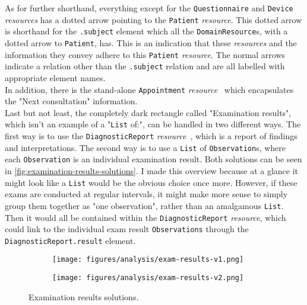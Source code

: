 \noindent
As for further shorthand, everything except for the \texttt{Questionnaire} and \texttt{Device} \emph{resources} has a dotted arrow pointing to the \texttt{Patient} \emph{resource}. This dotted arrow is shorthand for the \texttt{.subject} element which all the \texttt{DomainResource}s, with a dotted arrow to \texttt{Patient}, has. This is an indication that these \emph{resources} and the information they convey adhere to this \texttt{Patient} \emph{resource}. The normal arrows indicate a relation other than the \texttt{.subject} relation and are all labelled with appropriate element names.
\\
In addition, there is the stand-alone \texttt{Appointment} \emph{resource}~\cite{FHIR-Appointment-resource} which encapsulates the "Next consultation" information.
\\
Last but not least, the completely dark rectangle called "Examination results", which isn't an example of a "\texttt{List} of:", can be handled in two different ways. The first way is to use the \texttt{DiagnosticReport} \emph{resource}~\cite{FHIR-DiagnosticReport-resource}, which is a report of findings and interpretations. The second way is to use a \texttt{List} of \texttt{Observation}s, where each \texttt{Observation} is an individual examination result. Both solutions can be seen in \autoref{fig:examination-results-solutions}. I made this overview because at a glance it might look like a \texttt{List} would be the obvious choice once more. However, if these exams are conducted at regular intervals, it might make more sense to simply group them together as "one observation", rather than an amalgamous \texttt{List}. Then it would all be contained within the \texttt{DiagnosticReport} \emph{resource}, which could link to the individual exam result \texttt{Observations} through the \texttt{DiagnosticReport.result} element.

\begin{figure}[H]
    \centering
    \begin{subfigure}[t]{0.70\textwidth}
        \centering
        \texttt{[image: figures/analysis/exam-results-v1.png]}
    \end{subfigure}
    \hfill
    \begin{subfigure}[t]{0.25\textwidth}
        \centering
        \texttt{[image: figures/analysis/exam-results-v2.png]}
    \end{subfigure}
    \caption{Examination results solutions.}
    \label{fig:examination-results-solutions}
\end{figure}

